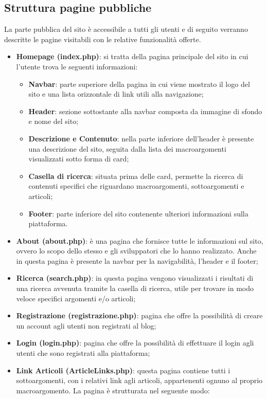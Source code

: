 \documentclass[12pt]{article}
\begin{document}
	\subsection{Struttura pagine pubbliche}
		La parte pubblica del sito è accessibile a tutti gli utenti e di seguito verranno descritte le pagine visitabili con le relative funzionalità offerte.
		\begin{itemize}
				\item \textbf{Homepage (index.php)}: si tratta della pagina principale del sito in cui l'utente trova le seguenti informazioni:
				\begin{itemize}
						\item \textbf{Navbar}: parte superiore della pagina in cui viene mostrato il logo del sito e una lista orizzontale di link utili alla navigazione;
						\item \textbf{Header}: sezione sottostante alla navbar composta da immagine di sfondo e nome del sito;
						\item \textbf{Descrizione e Contenuto}: nella parte inferiore dell'header è presente una descrizione del sito, seguita dalla lista dei macroargomenti visualizzati sotto forma di card;
						\item \textbf{Casella di ricerca}: situata prima delle card, permette la ricerca di contenuti specifici che riguardano macroargomenti, sottoargomenti e articoli;
						\item \textbf{Footer}: parte inferiore del sito contenente ulteriori informazioni sulla piattaforma.
				\end{itemize}
			\item \textbf{About (about.php)}: è una pagina che fornisce tutte le informazioni sul sito, ovvero lo scopo dello stesso e gli sviluppatori che lo hanno realizzato. Anche in questa pagina è presente la navbar per la navigabilità, l'header e il footer;
			\item \textbf{Ricerca (search.php)}: in questa pagina vengono visualizzati i risultati di una ricerca avvenuta tramite la casella di ricerca, utile per trovare in modo veloce specifici argomenti e/o articoli;
			\item \textbf{Registrazione (registrazione.php)}: pagina che offre la possibilità di creare un account agli utenti non registrati al blog;
			\item \textbf{Login (login.php)}: pagina che offre la possibilità di effettuare il login agli utenti che sono registrati alla piattaforma;
			\item \textbf{Link Articoli (ArticleLinks.php)}: questa pagina contiene tutti i sottoargomenti, con i relativi link agli articoli, appartenenti ognuno al proprio macroargomento. La pagina è strutturata nel seguente modo:

\end{itemize}
\end{document}
